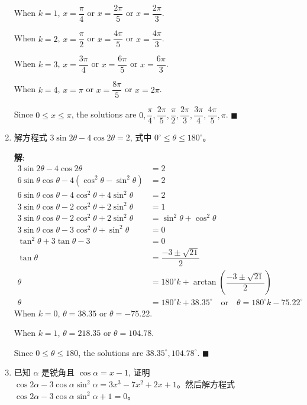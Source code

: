 \documentclass{report}
\newcommand{\sol}{\vspace{0.2cm}\textbf{解}:}
\begin{document}
\begin{enumerate}[leftmargin=*]
        When $k = 1$, $x = \dfrac{\pi}{4}$ or $x = \dfrac{2\pi}{5}$ or $x = \dfrac{2\pi}{3}$.

        When $k = 2$, $x = \dfrac{\pi}{2}$ or $x = \dfrac{4\pi}{5}$ or $x = \dfrac{4\pi}{3}$.

        When $k = 3$, $x = \dfrac{3\pi}{4}$ or $x = \dfrac{6\pi}{5}$ or $x = \dfrac{6\pi}{3}$.

        When $k = 4$, $x = \pi$ or $x = \dfrac{8\pi}{5}$ or $x = 2\pi$.

        Since $0 \leq x \leq \pi$, the solutions are $0, \dfrac{\pi}{4}, \dfrac{2\pi}{5}, \dfrac{\pi}{2}, \dfrac{2\pi}{3}, \dfrac{3\pi}{4}, \dfrac{4\pi}{5}, \pi$. \hfill $\blacksquare$
        
        \item 解方程式 $3 \sin 2 \theta-4 \cos 2 \theta=2$, 式中 $0^{\circ} \leq \theta \leq 180^{\circ}$。
        
        \sol{}
        \begin{align*}
            3 \sin 2 \theta-4 \cos 2 \theta &= 2\\
            6\sin\theta\cos\theta - 4(\cos^2\theta - \sin^2\theta) &= 2\\
            6\sin\theta\cos\theta - 4\cos^2\theta + 4\sin^2\theta &= 2\\
            3\sin\theta\cos\theta - 2\cos^2\theta + 2\sin^2\theta &= 1\\
            3\sin\theta\cos\theta - 2\cos^2\theta + 2\sin^2\theta &= \sin^2\theta + \cos^2\theta\\
            3\sin\theta\cos\theta - 3\cos^2\theta + \sin^2\theta &= 0\\
            \tan^2\theta + 3\tan\theta - 3 &= 0\\
            \tan\theta &= \dfrac{-3 \pm \sqrt{21}}{2}\\
            \theta &= 180^{\circ}k + \arctan\left(\dfrac{-3 \pm \sqrt{21}}{2}\right)\\
            \theta &= 180^{\circ}k + 38.35^{\circ} \quad \text{or} \quad \theta = 180^{\circ}k - 75.22^{\circ}
        \end{align*}
        When $k = 0$, $\theta = 38.35$ or $\theta = -75.22$.

        When $k = 1$, $\theta = 218.35$ or $\theta = 104.78$.

        Since $0 \leq \theta \leq 180$, the solutions are $38.35^{\circ}, 104.78^{\circ}$. \hfill $\blacksquare$
        
        \newpage
        \item 已知 $\alpha$ 是锐角且 $\cos \alpha=x-1$, 证明 $\cos 2 \alpha-3 \cos \alpha \sin ^2 \alpha=3 x^3-7 x^2+2 x+1$。然后解方程式 $\cos 2 \alpha-3 \cos \alpha \sin ^2 \alpha+1=0$。
        

\end{enumerate}
\end{document}
